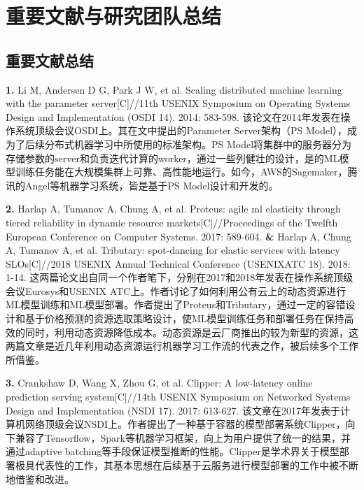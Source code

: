 \chapter{重要文献与研究团队总结}

\section{重要文献总结}
\textbf{1. }Li M, Andersen D G, Park J W, et al. Scaling distributed machine learning with the parameter server[C]//11th {USENIX} Symposium on Operating Systems Design and Implementation ({OSDI} 14). 2014: 583-598. 该论文在2014年发表在操作系统顶级会议OSDI上。其在文中提出的Parameter Server架构（PS Model），成为了后续分布式机器学习中所使用的标准架构。PS Model将集群中的服务器分为存储参数的server和负责迭代计算的worker，通过一些列健壮的设计，是的ML模型训练任务能在大规模集群上可靠、高性能地运行。如今，AWS的Sagemaker\parencite{joshi2020amazon}，腾讯的Angel\parencite{jiang2018angel}等机器学习系统，皆是基于PS Model设计和开发的。

\textbf{2. }Harlap A, Tumanov A, Chung A, et al. Proteus: agile ml elasticity through tiered reliability in dynamic resource markets[C]//Proceedings of the Twelfth European Conference on Computer Systems. 2017: 589-604. \textbf{\&} Harlap A, Chung A, Tumanov A, et al. Tributary: spot-dancing for elastic services with latency SLOs[C]//2018 {USENIX} Annual Technical Conference ({USENIX}{ATC} 18). 2018: 1-14. 这两篇论文出自同一个作者笔下，分别在2017和2018年发表在操作系统顶级会议Eurosys和USENIX ATC上。作者讨论了如何利用公有云上的动态资源进行ML模型训练和ML模型部署。作者提出了Proteus和Tributary，通过一定的容错设计和基于价格预测的资源选取策略设计，使ML模型训练任务和部署任务在保持高效的同时，利用动态资源降低成本。动态资源是云厂商推出的较为新型的资源，这两篇文章是近几年利用动态资源运行机器学习工作流的代表之作，被后续多个工作\parencite{li2020spottune,peng2018optimus,sharma2017portfolio,cheng2018characterizing,li2019speeding,shastri2017hotspot,mayer2020scalable}所借鉴。

\textbf{3. }Crankshaw D, Wang X, Zhou G, et al. Clipper: A low-latency online prediction serving system[C]//14th {USENIX} Symposium on Networked Systems Design and Implementation ({NSDI} 17). 2017: 613-627. 该文章在2017年发表于计算机网络顶级会议NSDI上。作者提出了一种基于容器的模型部署系统Clipper，向下兼容了Tensorflow，Spark等机器学习框架，向上为用户提供了统一的结果，并通过adaptive batching等手段保证模型推断的性能。Clipper是学术界关于模型部署极具代表性的工作，其基本思想在后续基于云服务进行模型部署的工作中\parencite{zhang2019mark,hellerstein2018serverless,ishakian2018serving,chard2019dlhub,stoica2017a,gottschlich2018the,halpern2019one,bagchi2020new}被不断地借鉴和改进。


